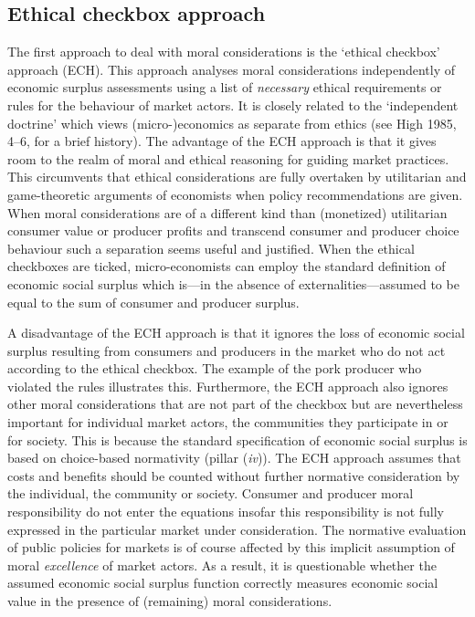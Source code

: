 \documentclass[
]{book}
\begin{document}
\hypertarget{ethical-checkbox-approach}{%
\subsection{Ethical checkbox approach}\label{ethical-checkbox-approach}}

The first approach to deal with moral considerations is the `ethical checkbox' approach (ECH). This approach analyses moral considerations independently of economic surplus assessments using a list of \emph{necessary} ethical requirements or rules for the behaviour of market actors. It is closely related to the `independent doctrine' which views (micro-)economics as separate from ethics (see High 1985, 4--6, for a brief history). The advantage of the ECH approach is that it gives room to the realm of moral and ethical reasoning for guiding market practices. This circumvents that ethical considerations are fully overtaken by utilitarian and game-theoretic arguments of economists when policy recommendations are given. When moral considerations are of a different kind than (monetized) utilitarian consumer value or producer profits and transcend consumer and producer choice behaviour such a separation seems useful and justified. When the ethical checkboxes are ticked, micro-economists can employ the standard definition of economic social surplus which is---in the absence of externalities---assumed to be equal to the sum of consumer and producer surplus.

A disadvantage of the ECH approach is that it ignores the loss of economic social surplus resulting from consumers and producers in the market who do not act according to the ethical checkbox. The example of the pork producer who violated the rules illustrates this. Furthermore, the ECH approach also ignores other moral considerations that are not part of the checkbox but are nevertheless important for individual market actors, the communities they participate in or for society. This is because the standard specification of economic social surplus is based on choice-based normativity (pillar (\emph{iv})). The ECH approach assumes that costs and benefits should be counted without further normative consideration by the individual, the community or society. Consumer and producer moral responsibility do not enter the equations insofar this responsibility is not fully expressed in the particular market under consideration. The normative evaluation of public policies for markets is of course affected by this implicit assumption of moral \emph{excellence} of market actors. As a result, it is questionable whether the assumed economic social surplus function correctly measures economic social value in the presence of (remaining) moral considerations.
\end{document}
